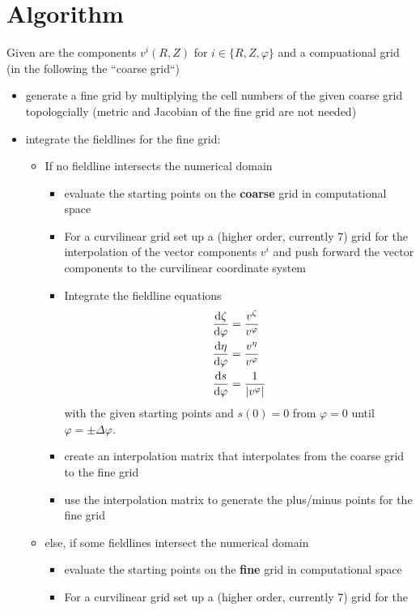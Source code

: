 \section{Algorithm}
Given are the components $v^i(R,Z)$ for $i\in\{R,Z,\varphi\}$ and a compuational grid (in the following the ``coarse grid``)
\begin{itemize}
  \item generate a fine grid by multiplying the cell numbers of the given coarse grid topologcially (metric and Jacobian of the fine grid are not needed)
  \item integrate the fieldlines for the fine grid:
  \begin{itemize}
  \item If no fieldline intersects the numerical domain
    \begin{itemize}
      \item evaluate the starting points on the \textbf{coarse} grid in computational space
      \item For a curvilinear grid set up a (higher order, currently 7) grid for the
        interpolation of the vector components $v^i$ and push forward the vector components
        to the curvilinear coordinate system
      \item Integrate the fieldline equations 
\begin{subequations}
\begin{align}
\frac{\mathrm{d} \zeta}{\mathrm{d}\varphi} &= \frac{v^\zeta}{v^\varphi}\\
\frac{\mathrm{d} \eta}{\mathrm{d}\varphi} &= \frac{v^\eta}{v^\varphi}\\
\frac{\mathrm{d} s}{\mathrm{d}\varphi} &= \frac{1}{|v^\varphi|}
\end{align}
\label{eq:fieldlines_converted}
\end{subequations}
    with the given starting points and $s(0)=0$ from $\varphi=0$ until $\varphi = \pm\Delta \varphi$.
      \item create an interpolation matrix that interpolates from the coarse grid
        to the fine grid
      \item use the interpolation matrix to generate the plus/minus points for the fine grid
    \end{itemize}
    \item else, if some fieldlines intersect the numerical domain
    \begin{itemize}
      \item evaluate the starting points on the \textbf{fine} grid in computational space
      \item For a curvilinear grid set up a (higher order, currently 7) grid for the

\end{itemize}
\end{itemize}
\end{itemize}
